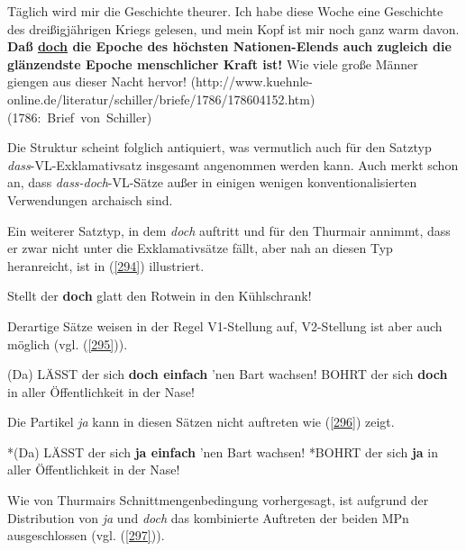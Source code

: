 \begin{exe}
	\ex\label{293} 
	\scriptsize
		Täglich wird mir die Geschichte theurer. Ich habe diese Woche eine Geschichte des dreißigjährigen Kriegs gelesen, und mein Kopf ist mir noch ganz warm davon. \textbf{Daß \underline{doch} die Epoche des höchsten Nationen-Elends auch zugleich die glänzendste Epoche menschlicher Kraft ist!} Wie viele große Männer giengen aus dieser Nacht hervor! 		
			\newline
			\hbox{}\hfill\hbox{(http://www.kuehnle-online.de/literatur/schiller/briefe/1786/178604152.htm)} 
			\newline
			\hbox{}\hfill\hbox{(1786: Brief von Schiller)}			
\end{exe}
Die Struktur scheint folglich antiquiert, was vermutlich auch für den Satztyp \textit{dass}-VL-Exklamativsatz insgesamt angenommen werden kann. Auch \citet[140]{Hentschel1986} merkt schon an, dass \textit{dass-doch}-VL-Sätze außer in einigen wenigen konventionalisierten Verwendungen archaisch sind.

Ein weiterer Satztyp, in dem \textit{doch} auftritt und für den Thurmair annimmt, dass er zwar nicht unter die Exklamativsätze fällt, aber nah an diesen Typ heranreicht, ist in (\ref{294}) illustriert.

\begin{exe}
	\ex\label{294} 
	Stellt der \textbf{doch} glatt den Rotwein in den Kühlschrank!
			\hfill\hbox {\citet[115]{Thurmair1989}}
\end{exe}
Derartige Sätze weisen in der Regel V1-Stellung auf, V2-Stellung ist aber auch möglich (vgl. (\ref{295})).

\begin{exe}
	\ex\label{295} 
		\begin{xlist}	
			\ex\label{295a} (Da) LÄSST der sich \textbf{doch einfach} 'nen Bart wachsen!
			\ex\label{295b} BOHRT der sich \textbf{doch} in aller Öffentlichkeit in der Nase!
			\hfill\hbox {\citet[217]{Rinas2006}}
		\end{xlist}
\end{exe}
Die Partikel \textit{ja} kann in diesen Sätzen nicht auftreten wie (\ref{296}) zeigt.

\begin{exe}
	\ex\label{296} 
		\begin{xlist}	
			\ex\label{296a} *(Da) LÄSST der sich \textbf{ja einfach} 'nen Bart wachsen!
			\ex\label{296b} *BOHRT der sich \textbf{ja} in aller Öffentlichkeit in der Nase!
			\hfill\hbox {\citet[218]{Rinas2006}}
		\end{xlist}
\end{exe}
Wie von Thurmairs Schnittmengenbedingung vorhergesagt, ist aufgrund der Distribution von \textit{ja} und \textit{doch} das kombinierte Auftreten der beiden MPn ausgeschlossen (vgl. (\ref{297})).


